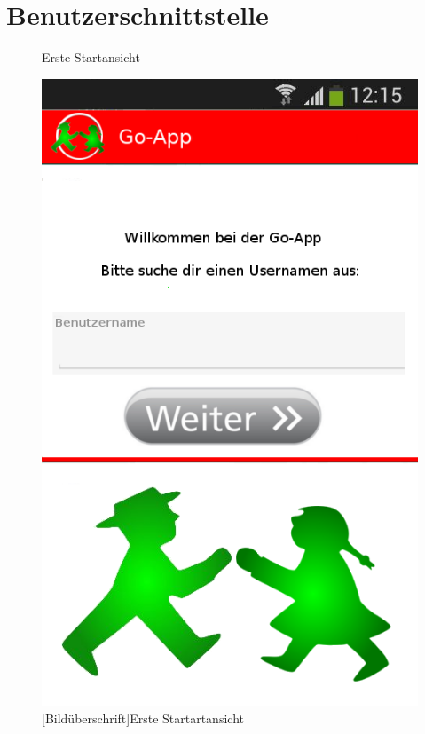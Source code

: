 \section{Benutzerschnittstelle}
\begin{figure} [H]
\caption{Erste Startansicht}
\includegraphics[scale = 0.5]{resources/images/startansicht.png}
\caption{
	[Bildüberschrift]Erste Startartansicht\\ \\

}
\end{figure}
